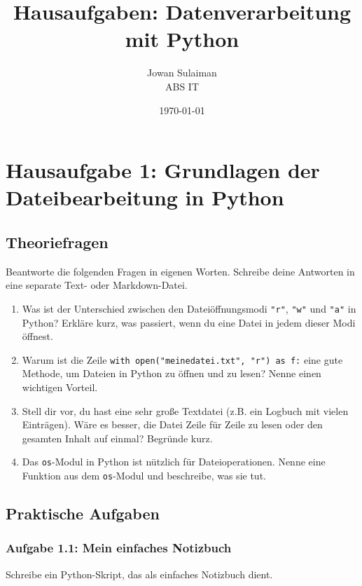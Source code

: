 \documentclass[11pt, a4paper]{article}
\title{Hausaufgaben: Datenverarbeitung mit Python}
\author{Jowan Sulaiman \\ ABS IT}
\date{\today}
\begin{document}
\maketitle
\thispagestyle{empty} %
\clearpage

\clearpage
\setcounter{page}{1} %

\section*{Hausaufgabe 1: Grundlagen der Dateibearbeitung in Python \faFolderOpen}

\subsection*{Theoriefragen}
Beantworte die folgenden Fragen in eigenen Worten. Schreibe deine Antworten in eine separate Text- oder Markdown-Datei.

\begin{enumerate}
    \item Was ist der Unterschied zwischen den Dateiöffnungsmodi \texttt{\texttt{"}r\texttt{"}}, \texttt{\texttt{"}w\texttt{"}} und \texttt{\texttt{"}a\texttt{"}} in Python? Erkläre kurz, was passiert, wenn du eine Datei in jedem dieser Modi öffnest.
    \item Warum ist die Zeile \texttt{with open(\texttt{"}meinedatei.txt\texttt{"}, \texttt{"}r\texttt{"}) as f:} eine gute Methode, um Dateien in Python zu öffnen und zu lesen? Nenne einen wichtigen Vorteil.
    \item Stell dir vor, du hast eine sehr große Textdatei (z.B. ein Logbuch mit vielen Einträgen). Wäre es besser, die Datei Zeile für Zeile zu lesen oder den gesamten Inhalt auf einmal? Begründe kurz.
    \item Das \texttt{os}-Modul in Python ist nützlich für Dateioperationen. Nenne eine Funktion aus dem \texttt{os}-Modul und beschreibe, was sie tut.
\end{enumerate}

\subsection*{Praktische Aufgaben \faLaptopCode}

\subsubsection*{Aufgabe 1.1: Mein einfaches Notizbuch}
Schreibe ein Python-Skript, das als einfaches Notizbuch dient.
\end{document}
